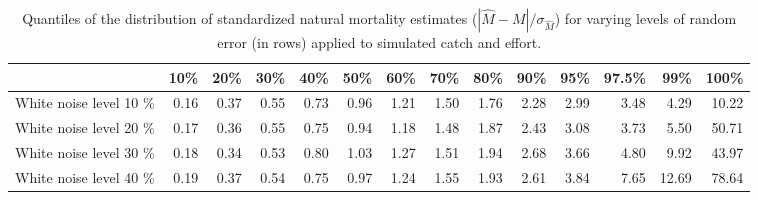 \begin{sidewaystable}[ht]
\centering
\begin{tabular}{rrrrrrrrrrrrrr}
  \hline
 & 10\% & 20\% & 30\% & 40\% & 50\% & 60\% & 70\% & 80\% & 90\% & 95\% & 97.5\% & 99\% & 100\% \\ 
  \hline
White noise level  10 \% & 0.16 & 0.37 & 0.55 & 0.73 & 0.96 & 1.21 & 1.50 & 1.76 & 2.28 & 2.99 & 3.48 & 4.29 & 10.22 \\ 
  White noise level  20 \% & 0.17 & 0.36 & 0.55 & 0.75 & 0.94 & 1.18 & 1.48 & 1.87 & 2.43 & 3.08 & 3.73 & 5.50 & 50.71 \\ 
  White noise level  30 \% & 0.18 & 0.34 & 0.53 & 0.80 & 1.03 & 1.27 & 1.51 & 1.94 & 2.68 & 3.66 & 4.80 & 9.92 & 43.97 \\ 
  White noise level  40 \% & 0.19 & 0.37 & 0.54 & 0.75 & 0.97 & 1.24 & 1.55 & 1.93 & 2.61 & 3.84 & 7.65 & 12.69 & 78.64 \\ 
   \hline
\end{tabular}
\caption{Quantiles of the distribution of standardized natural mortality estimates ($|\hat{M} - M|/\sigma_{\hat{M}}$) for varying levels of random error (in rows) applied to simulated catch and effort.} 
\label{tab:SummaryOfDistributionOfNaturalMortality}
\end{sidewaystable}
